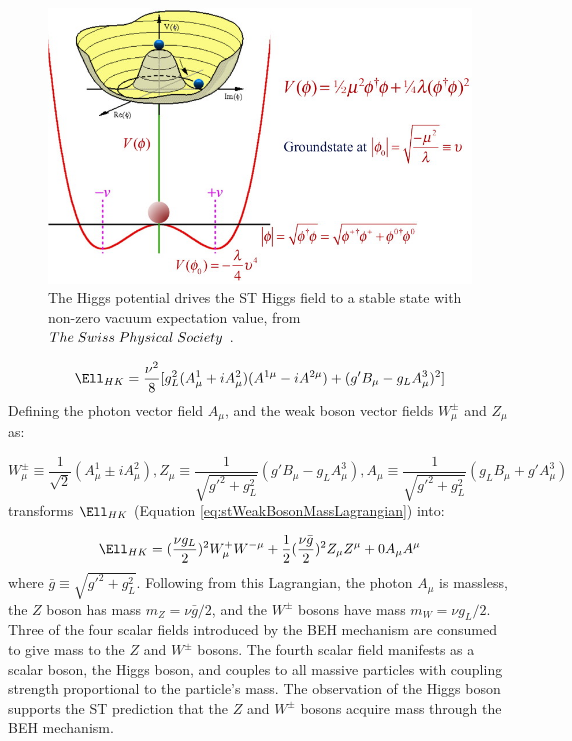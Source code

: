 \begin{figure}[h]
	\centering
	\includegraphics[width=1.0\textwidth]{figures/mexicanHatPotential.jpg}
	\caption{The Higgs potential drives the ST Higgs field to a stable state with non-zero vacuum expectation value, from $The\thickspace Swiss \thickspace Physical\thickspace Society$ \cite{higgsPotential}.}
	\label{fig:smHiggsPotential}
\end{figure}

\begin{equation}
	\Ell_{HK} = \frac{\nu^{2}}{8}[g^{2}_{L}(A^{1}_{\mu} + iA^{2}_{\mu})(A^{1\mu} - iA^{2\mu}) + (g'B_{\mu} - g_{L}A^{3}_{\mu})^{2}]
	\label{eq:stWeakBosonMassLagrangian}
\end{equation}
Defining the photon vector field $A_{\mu}$, and the weak boson vector fields $W^{\pm}_{\mu}$ and $Z_{\mu}$ as:

\begin{equation}
	W^{\pm}_{\mu} \equiv \frac{1}{\sqrt{2}}(A^{1}_{\mu} \pm iA^{2}_{\mu}), 
	Z_{\mu} \equiv \frac{1}{\sqrt{g'^{2} + g^{2}_{L}}}(g'B_{\mu} - g_{L}A^{3}_{\mu}), 
	A_{\mu} \equiv \frac{1}{\sqrt{g'^{2} + g^{2}_{L}}}(g_{L}B_{\mu} + g'A^{3}_{\mu})
\end{equation}
transforms $\Ell_{HK}$ (Equation \ref{eq:stWeakBosonMassLagrangian}) into:

\begin{equation}
	\Ell_{HK} = (\frac{\nu g_{L}}{2})^{2}W^{+}_{\mu}W^{-\mu} + \frac{1}{2}(\frac{\nu \bar{g}}{2})^{2}Z_{\mu}Z^{\mu} + 0A_{\mu}A^{\mu}
\end{equation}
where $\bar{g} \equiv \sqrt{g'^{2} + g^{2}_{L}}$.  Following from this Lagrangian, the photon $A_{\mu}$ is massless, 
the $Z$ boson has mass $m_{Z} = \nu\bar{g}/2$, and the $W^{\pm}$ bosons have mass $m_{W} = \nu g_{L}/2$.  
Three of the four scalar fields introduced by the BEH mechanism are consumed to give mass to the $Z$ 
and $W^{\pm}$ bosons.  The fourth scalar field manifests as a scalar boson, the Higgs boson, and couples to all 
massive particles with coupling strength proportional to the particle's mass.  The observation 
of the Higgs boson \cite{combinedHiggsResult} supports the ST prediction that the $Z$ and $W^{\pm}$ bosons acquire 
mass through the BEH mechanism.

